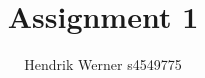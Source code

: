 \documentclass[12pt, a4paper]{article}
\title{Assignment 1}
\author{Hendrik Werner s4549775}
\begin{document}
\maketitle

\section{} %

\section{} %

\section{} %
\end{document}
